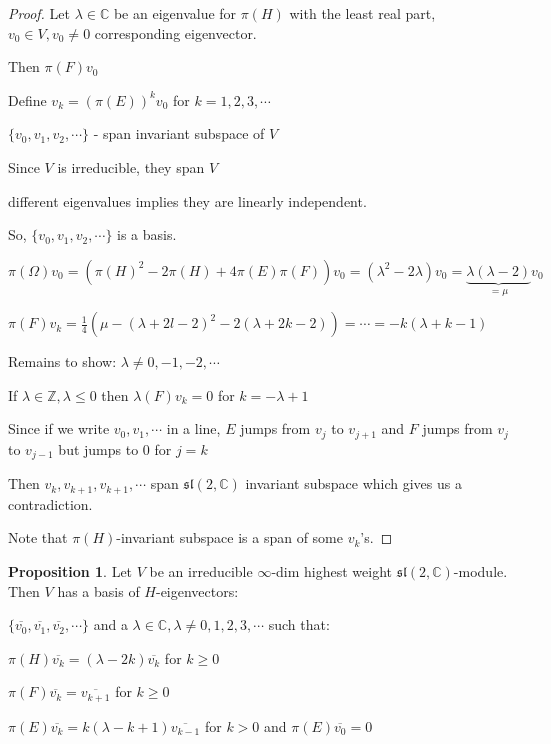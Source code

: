 \documentclass{article}
\theoremstyle{definition}
\newtheorem{proposition}{Proposition}
\begin{document}
\begin{proof}
    Let \(\lambda \in \mathbb{C}\) be an eigenvalue for \(\pi(H)\) with the least real part, \(v_0 \in V, v_0 \neq 0\) corresponding eigenvector.
    
    Then \(\pi(F)v_0\)
    
    Define \(v_k = (\pi(E))^k v_0\) for \(k = 1,2,3,\cdots\)
    
    \(\{ v_0, v_1, v_2, \cdots \} \) - span invariant subspace of \(V\) 
    
    Since \(V\) is irreducible, they span \(V\) 

    different eigenvalues implies they are linearly independent.

    So, \(\{ v_0, v_1, v_2, \cdots \} \) is a basis.

    \(\pi(\Omega) v_0 = (\pi(H)^2 - 2\pi(H) + 4\pi(E)\pi(F))v_0 = (\lambda^2 - 2\lambda)v_0 = \underbrace{\lambda (\lambda - 2)}_{=\mu}v_0\)
    
    \(\pi(F)v_k = \frac{1}{4}(\mu - (\lambda + 2l - 2)^2 - 2(\lambda + 2k - 2)) = \cdots = -k (\lambda + k - 1)\) 

    Remains to show: \(\lambda \neq 0, -1, -2, \cdots\)
    
    If \(\lambda \in\mathbb{Z} , \lambda \leq 0\) then \(\lambda (F) v_k = 0\) for \(k = -\lambda + 1\) 
    
    Since if we write \(v_0, v_1, \cdots\) in a line, \(E\) jumps from \(v_j\) to \(v_{j+1} \) and \(F\) jumps from \(v_j\) to \(v_{j-1}\) but jumps to \(0\) for \(j = k\) 

    Then \(v_k, v_{k+1}, v_{k+1}, \cdots  \) span \(\mathfrak{sl}(2,\mathbb{C})\) invariant subspace which gives us a contradiction.  

    Note that \(\pi(H)\)-invariant subspace is a span of some \(v_k\)'s. 
\end{proof}

\begin{proposition}
    Let \(V\) be an irreducible \(\infty\)-dim highest weight \(\mathfrak{sl}(2,\mathbb{C})\)-module. Then \(V\) has a basis of \(H\)-eigenvectors:
    
    \(\{ \overline{v_0}, \overline{v_1}, \overline{v_2},\cdots \} \) and a \(\lambda \in \mathbb{C} , \lambda \neq 0,1,2,3,\cdots\) such that:

    \(\pi(H)\overline{v_k} = (\lambda - 2k)\overline{v_k}\) for \(k \geq 0\)   

    \(\pi(F)\overline{v_k} = \overline{v_{k+1}} \) for \(k \geq 0\) 
    
    \(\pi(E)\overline{v_k} = k(\lambda - k + 1)\overline{v_{k-1}} \) for \(k > 0\) and \(\pi(E)\overline{v_0} = 0\) 
\end{proposition}
\end{document}
